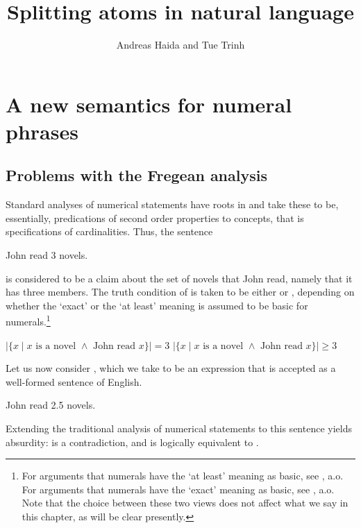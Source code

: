 \documentclass[output=paper]{langscibook}
\author{Andreas Haida\affiliation{The Hebrew University of Jerusalem} and  Tue Trinh\affiliation{Leibniz-Zentrum Allgemeine Sprachwissenschaft}}
\title{Splitting atoms in natural language}
\begin{document}
\maketitle

\section{A new semantics for numeral phrases}

\subsection{Problems with the Fregean analysis}\largerpage[.25]

Standard analyses of numerical statements have roots in \citet{frege1884grundlagen} and take these to be, essentially, predications of second order properties to concepts, that is specifications of cardinalities. Thus, the sentence 

\ea 
John read 3 novels.
\label{hai-tri:3novels}
\z

\noindent is considered to be a claim about the set of novels that John read, namely that it has three members. The truth condition of  is taken to be either  or , depending on whether the `exact' or the `at least' meaning is assumed to be basic for numerals.\footnote{For arguments that numerals have the `at least' meaning as basic, see \citet{horn1972semantic,fintelheim1997classnotes,fintelfox2002classnotes,fox2007class}, a.o. For arguments that numerals have the `exact' meaning as basic, see \citet{geurts2006take,breheny2008new}, a.o. Note that the choice between these two views does not affect what we say in this chapter, as will be clear presently.}

\ea
\ea $|\{x \mid \text{$x$ is a novel $\wedge$ John read $x$}\}| = 3$ 
\label{hai-tri:eq3}
\ex $|\{x \mid \text{$x$ is a novel $\wedge$ John read $x$}\}| \geq 3$ 
\label{hai-tri:geq3}
\z
\z

\noindent Let us now consider , which we take to be an expression that is accepted as a well-formed sentence of English. 

\ea 
John read 2.5 novels. 
\label{hai-tri:2.5-1}
\z

\noindent Extending the traditional analysis of numerical statements to this sentence yields absurdity:  is a contradiction, and  is logically equivalent to .
\end{document}
